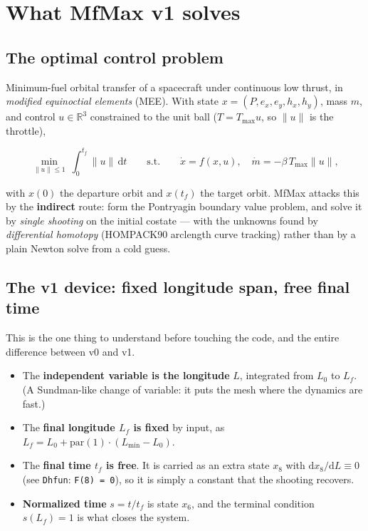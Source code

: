 \documentclass[11pt]{article}
\newcommand{\code}[1]{\texttt{\small #1}}
\newcommand{\Tmax}{T_{\max}}
\newcommand{\Lf}{L_f}
\begin{document}
\section{What MfMax v1 solves}\label{sec:what}

\subsection{The optimal control problem}

Minimum-fuel orbital transfer of a spacecraft under continuous low thrust,
in \emph{modified equinoctial elements} (MEE). With state
$x = (P, e_x, e_y, h_x, h_y)$, mass $m$, and control $u \in \mathbb{R}^3$
constrained to the unit ball ($T = \Tmax u$, so $\|u\|$ is the throttle),

\begin{equation}
\min_{\|u\|\le 1}\ \int_{0}^{t_f}\!\|u\|\,\mathrm{d}t
\qquad\text{s.t.}\qquad
\dot x = f(x,u),\quad \dot m = -\beta\,\Tmax\|u\|,
\end{equation}

\noindent
with $x(0)$ the departure orbit and $x(t_f)$ the target orbit. MfMax attacks
this by the \textbf{indirect} route: form the Pontryagin boundary value
problem, and solve it by \emph{single shooting} on the initial costate ---
with the unknowns found by \emph{differential homotopy} (HOMPACK90 arclength
curve tracking) rather than by a plain Newton solve from a cold guess.

\subsection{The v1 device: fixed longitude span, free final time}
\label{sec:device}

This is the one thing to understand before touching the code, and the entire
difference between v0 and v1.

\begin{itemize}
\item The \textbf{independent variable is the longitude} $L$, integrated from
      $L_0$ to $\Lf$. (A Sundman-like change of variable: it puts the mesh
      where the dynamics are fast.)
\item The \textbf{final longitude $\Lf$ is fixed} by input, as
      $\Lf = L_0 + \mathrm{par}(1)\cdot(L_{\min} - L_0)$.
\item The \textbf{final time $t_f$ is free}. It is carried as an extra state
      $x_8$ with $\mathrm{d}x_8/\mathrm{d}L \equiv 0$ (see \code{Dhfun}:
      \code{F(8) = 0}), so it is simply a constant that the shooting recovers.
\item \textbf{Normalized time} $s = t/t_f$ is state $x_6$, and the terminal
      condition $s(\Lf) = 1$ is what closes the system.
\end{itemize}
\end{document}
